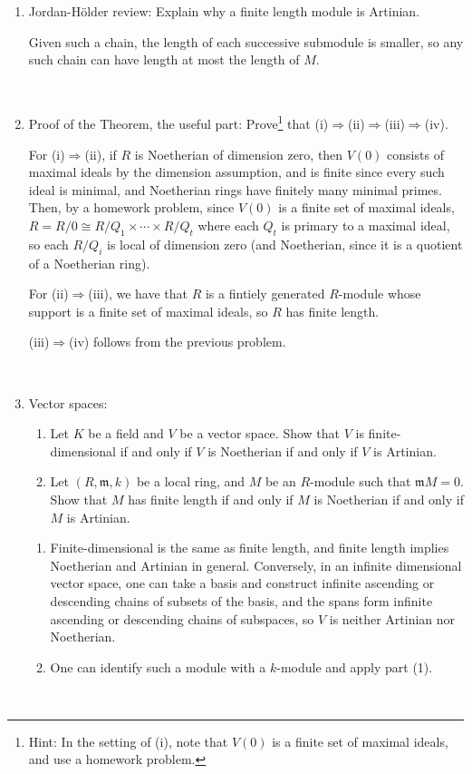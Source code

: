 \documentclass[12pt]{amsart}
\newcommand{\Bold}[1]{\contour{black}{#1}}
\newcommand{\m}{\mathfrak{m}}
\renewcommand{\1}{\mathbbm{1}}
\newcommand{\solution}[1]{\ifthenelse {\equal{\displaysol}{1}} {\begin{framed}{\color{meretale}\noindent #1}\end{framed}} { \ }}
\newcommand\itemA{\stepcounter{enumi}\item[{\Bold{(\theenumi)}}]}
\newcommand\itemB{\stepcounter{enumi}\item[(\theenumi)]}
\newcommand\itema{\stepcounter{enumii}\item[{\Bold{(\theenumii)}}]}
\newcommand\itemb{\stepcounter{enumii}\item[(\theenumii)]}
\begin{document}
\begin{enumerate}
\itemA Jordan-H\"older review: Explain why a finite length module is Artinian.

\solution{Given such a chain, the length of each successive submodule is smaller, so any such chain can have length at most the length of $M$.
}


\itemA Proof of the Theorem, the useful part: Prove\footnote{Hint: In the setting of (i), note that $V(0)$ is a finite set of maximal ideals, and use a homework problem.} that (i)$\Rightarrow$(ii)$\Rightarrow$(iii)$\Rightarrow$(iv).

\solution{For (i)$\Rightarrow$(ii), if $R$ is Noetherian of dimension zero, then $V(0)$ consists of maximal ideals by the dimension assumption, and is finite since every such ideal is minimal, and Noetherian rings have finitely many minimal primes. Then, by a homework problem, since $V(0)$ is a finite set of maximal ideals, $R=R/0 \cong R/Q_1 \times \cdots \times R/Q_t$ where each $Q_t$ is primary to a maximal ideal, so each $R/Q_i$ is local of dimension zero (and Noetherian, since it is a quotient of a Noetherian ring).

For (ii)$\Rightarrow$(iii), we have that $R$ is a fintiely generated $R$-module whose support is a finite set of maximal ideals, so $R$ has finite length.

(iii)$\Rightarrow$(iv) follows from the previous problem.
}

\itemB Vector spaces:
\begin{enumerate} 
\itemb Let $K$ be a field and $V$ be a vector space. Show that $V$ is finite-dimensional if and only if $V$ is Noetherian if and only if $V$ is Artinian.
\itemb Let $(R,\m,k)$ be a local ring, and $M$ be an $R$-module such that $\m M=0$. Show that 
$M$ has finite length  if and only if $M$ is Noetherian  if and only if $M$ is Artinian.
\end{enumerate}

\solution{
\begin{enumerate} 
\itema Finite-dimensional is the same as finite length, and finite length implies Noetherian and Artinian in general. Conversely, in an infinite dimensional vector space, one can take a basis and construct infinite ascending or descending chains of subsets of the basis, and the spans form infinite ascending or descending chains of subspaces, so $V$ is neither Artinian nor Noetherian.
\itema One can identify such a module with a $k$-module and apply part (1).
\end{enumerate}
}


\end{enumerate}
\end{document}
